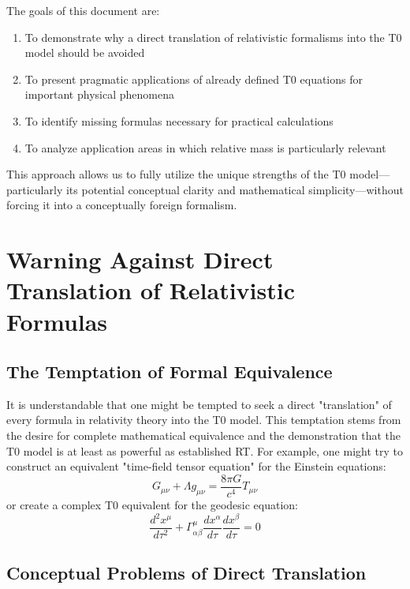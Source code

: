 \documentclass[12pt,a4paper]{article}
\begin{document}
	The goals of this document are:
	\begin{enumerate}
		\item To demonstrate why a direct translation of relativistic formalisms into the T0 model should be avoided
		\item To present pragmatic applications of already defined T0 equations for important physical phenomena
		\item To identify missing formulas necessary for practical calculations
		\item To analyze application areas in which relative mass is particularly relevant
	\end{enumerate}
	
	This approach allows us to fully utilize the unique strengths of the T0 model—particularly its potential conceptual clarity and mathematical simplicity—without forcing it into a conceptually foreign formalism.
	
	\section{Warning Against Direct Translation of Relativistic Formulas}
	\label{sec:warning}
	
	\subsection{The Temptation of Formal Equivalence}
	\label{subsec:temptation}
	
	It is understandable that one might be tempted to seek a direct "translation" of every formula in relativity theory into the T0 model. This temptation stems from the desire for complete mathematical equivalence and the demonstration that the T0 model is at least as powerful as established RT. For example, one might try to construct an equivalent "time-field tensor equation" for the Einstein equations:
	\begin{equation}
		G_{\mu\nu} + \Lambda g_{\mu\nu} = \frac{8\pi G}{c^4} T_{\mu\nu}
	\end{equation}
	or create a complex T0 equivalent for the geodesic equation:
	\begin{equation}
		\frac{d^2 x^\mu}{d\tau^2} + \Gamma^\mu_{\alpha\beta} \frac{dx^\alpha}{d\tau} \frac{dx^\beta}{d\tau} = 0
	\end{equation}
	
	\subsection{Conceptual Problems of Direct Translation}
	\label{subsec:conceptual_problems}
	
\end{document}
